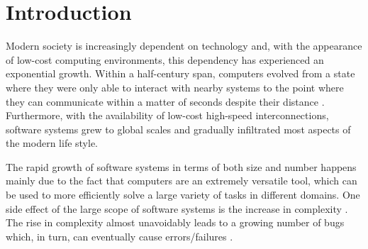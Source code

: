 \renewcommand{\BrainFuckChapter}{%
  {-}{[}{-}{-}{-}{-}{-}{-}{-}{>}{+}{<}{]}{>}{.}{+}{[}{-}{-}{-}{>}{+}{<}{]}{>}{.}{+}{+}{+}{+}{+}{+}{.}{-}{-}{.}{-}{-}{-}{.}{-}{-}{-}{-}{-}{-}{-}{-}{-}{-}{-}{.}{-}{-}{[}{-}{-}{-}{>}{+}{<}{]}{>}{-}{.}{+}{[}{-}{>}{+}
  {+}{+}{<}{]}{>}{+}{.}{-}{[}{-}{-}{-}{>}{+}{<}{]}{>}{-}{-}{.}{-}{-}{-}{-}{-}{-}{-}{-}{-}{-}{-}{.}{+}{+}{+}{+}{+}{+}{.}{-}{.}{-}{>}{<}{>}{>}{+}{+}{>}{>}{+}{<}{-}{-}{>}{-}{<}{<}{+}{<}{>}{>}{+}{>}{-}{<}{<}{-}{+}{+}
  {-}{>}{-}{-}{+}{+}{<}{>}{+}{-}{<}{>}{+}{>}{<}{>}{-}{<}{>}{<}{-}{+}{-}{<}{+}{>}{>}{<}{>}{-}{-}{-}{-}{>}{>}{<}{-}{>}{+}{-}{-}{<}{<}{>}{-}{>}{-}{>}{>}{<}{<}{-}{-}{+}{<}{<}{+}{-}{<}{>}{<}{+}{+}{-}{<}{+}{<}{<}{-}{<}
}
\renewcommand{\LifeChapter}{y}


\chapter{Introduction}
\label{sec:introduction}

Modern society is increasingly dependent on technology and, with the
appearance of low-cost computing environments, this dependency has
experienced an exponential growth.
%
Within a half-century span, computers evolved from a state where they
were only able to interact with nearby systems to the point where they
can communicate within a matter of seconds despite their distance
\citep{Allan01,Polsson}.
%
Furthermore, with the availability of low-cost high-speed
interconnections, software systems grew to global scales and gradually
infiltrated most aspects of the modern life style.

The rapid growth of software systems in terms of both size and number
happens mainly due to the fact that computers are an extremely
versatile tool, which can be used to more efficiently solve a large
variety of tasks in different domains.
%
One side effect of the large scope of software systems is the increase
in complexity \citep{Horn01}.
%
The rise in complexity almost unavoidably leads to a growing number of
bugs which, in turn, can eventually cause errors/failures
\citep{Salehie05}.


